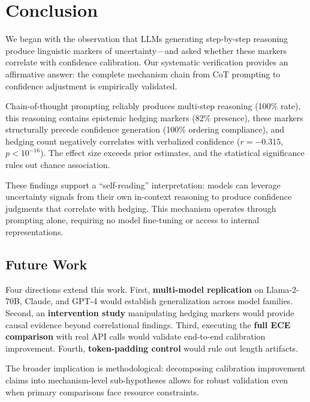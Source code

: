 \section{Conclusion}

We began with the observation that LLMs generating step-by-step reasoning produce linguistic markers of uncertainty---and asked whether these markers correlate with confidence calibration. Our systematic verification provides an affirmative answer: the complete mechanism chain from CoT prompting to confidence adjustment is empirically validated.

Chain-of-thought prompting reliably produces multi-step reasoning (100\% rate), this reasoning contains epistemic hedging markers (82\% presence), these markers structurally precede confidence generation (100\% ordering compliance), and hedging count negatively correlates with verbalized confidence ($r=-0.315$, $p<10^{-16}$). The effect size exceeds prior estimates, and the statistical significance rules out chance association.

These findings support a ``self-reading'' interpretation: models can leverage uncertainty signals from their own in-context reasoning to produce confidence judgments that correlate with hedging. This mechanism operates through prompting alone, requiring no model fine-tuning or access to internal representations.

\subsection{Future Work}

Four directions extend this work. First, \textbf{multi-model replication} on Llama-2-70B, Claude, and GPT-4 would establish generalization across model families. Second, an \textbf{intervention study} manipulating hedging markers would provide causal evidence beyond correlational findings. Third, executing the \textbf{full ECE comparison} with real API calls would validate end-to-end calibration improvement. Fourth, \textbf{token-padding control} would rule out length artifacts.

The broader implication is methodological: decomposing calibration improvement claims into mechanism-level sub-hypotheses allows for robust validation even when primary comparisons face resource constraints.
